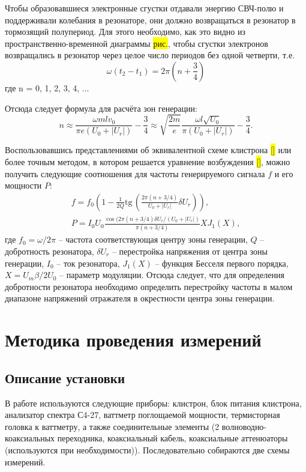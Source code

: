 \documentclass[a4paper,14pt]{extarticle}
\renewcommand{\tan}{\mathrm{tg\,}}
\begin{document}
	Чтобы  образовавшиеся  электронные  сгустки  отдавали  энергию  СВЧ-полю и поддерживали колебания в резонаторе, они должно возвращаться в резонатор в тормозящий полупериод. Для этого необходимо, как это видно из пространственно-временной диаграммы \colorbox{yellow}{рис.},  чтобы  сгустки  электронов  возвращались  в  резонатор  через целое число периодов без одной четверти, т.е. 
	$$ \omega (t_2 - t_1) = 2\pi \left(n + \frac{3}{4}\right)$$
	где n = 0, 1, 2, 3, 4, ... 
	
	Отсюда следует формула для расчёта зон генерации:
	\begin{equation}
	n \approx \frac{\omega mlv_0}{\pi e(U_0 + |U_r|)} - \frac{3}{4} \approx \sqrt{\frac{2m}{e}}\frac{\omega l\sqrt{U_0}}{\pi (U_0 + |U_r|)} - \frac{3}{4}.
    \label{eq:n}
	\end{equation}
	
	Воспользовавшись представлениями об эквивалентной схеме клистрона \colorbox{yellow}{[]} или более точным методом, в котором решается уравнение возбуждения \colorbox{yellow}{[]}, можно получить следующие соотношения для частоты генерируемого сигнала $f$ и его мощности $P$:
	\begin{gather}
	f = f_0 \left(1 - \frac{1}{2Q} \tan \left( \frac{2\pi(n + 3/4)}{U_0 + |U_r|} \delta U_r \right)\right), \label{eq:Q}\\
	P = I_0 U_0 \frac{\cos (2\pi (n + 3/4)\delta U_r/(U_0 + |U_r|)}{\pi (n + 3/4)} X J_1(X),
	\end{gather}
	где $f_0 = \omega/2\pi$ -- частота соответствующая центру зоны генерации, $Q$ -- добротность резонатора, $\delta U_r$ -- перестройка напряжения от центра зоны генерации, $I_0$ -- ток резонатора, $J_1(X)$ -- функция Бесселя первого порядка, $X = U_m\beta/2U_0$ -- параметр модуляции. Отсюда следует, что для определения добротности резонатора необходимо определить перестройку частоты в малом диапазоне напряжений отражателя в окрестности центра зоны генерации.
	
	\section{Методика проведения измерений}
	\subsection{Описание установки}
	В работе используются следующие приборы: клистрон, блок питания клистрона, анализатор спектра С4-27, ваттметр поглощаемой мощности, термисторная головка к ваттметру, а также соединительные элементы (2 волноводно-коаксиальных переходника, коаксиальный кабель,  коаксиальные аттенюаторы (используются при необходимости)). Последовательно собираются две схемы измерений.
	
\end{document}
